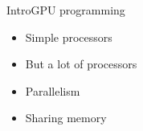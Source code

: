 \begin{frame}{Intro}{GPU programming}
	\begin{itemize}
		\item Simple processors
		\item But a lot of processors
		\item Parallelism
		\item Sharing memory
	\end{itemize}
\end{frame}

